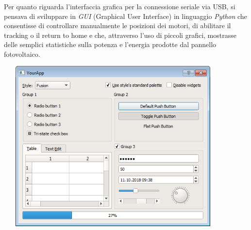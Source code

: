 \noindent Per quanto riguarda l'interfaccia grafica per la connessione seriale via
USB, si pensava di sviluppare in \textit{GUI} (Graphical User Interface) in
linguaggio \textit{Python} che consentisse di controllare manualmente le
posizioni dei motori, di abilitare il tracking o il return to home e
che, attraverso l'uso di piccoli grafici, mostrasse delle semplici
statistiche sulla potenza e l'energia prodotte dal pannello
fotovoltaico.

\begin{center}
\includegraphics[width=4.68229in,height=3.4426in]{figures/image47.png}
\captionsetup{type=figure}
\end{center}

